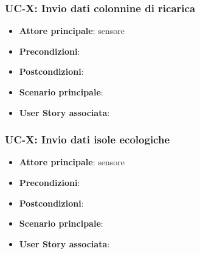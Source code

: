 \documentclass[8pt]{article}
\begin{document}

\subsubsection{UC-X: Invio dati colonnine di ricarica}
\begin{itemize}
    \item \textbf{Attore principale}: sensore
    \item \textbf{Precondizioni}:
    \item \textbf{Postcondizioni}:
    \item \textbf{Scenario principale}:
    \item \textbf{User Story associata}:
\end{itemize}

\subsubsection{UC-X: Invio dati isole ecologiche}
\begin{itemize}
    \item \textbf{Attore principale}: sensore
    \item \textbf{Precondizioni}:
    \item \textbf{Postcondizioni}:
    \item \textbf{Scenario principale}:
    \item \textbf{User Story associata}:
\end{itemize}
\end{document}
